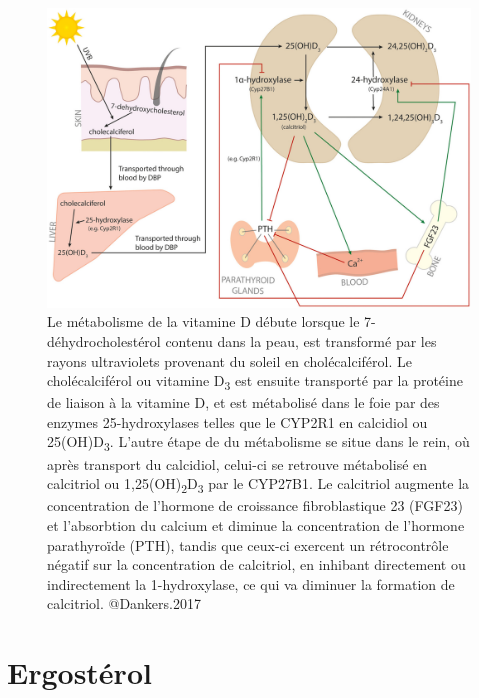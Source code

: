\documentclass[
  a4paper,
  DIV=11,
  numbers=noendperiod,
  listof=totoc]{scrreprt}
\begin{document}
\begin{figure}
\includegraphics{figures/vitamin-d-metabolism-regulation.jpg} 
\caption[\textbf{Métabolisme et régulation de la vitamine D.}]{Le métabolisme de la vitamine D débute lorsque le 7-déhydrocholestérol contenu dans la peau, est transformé par les rayons ultraviolets provenant du soleil en cholécalciférol. Le cholécalciférol ou vitamine D\textsubscript{3} est ensuite transporté par la protéine de liaison à la vitamine D, et est métabolisé dans le foie par des enzymes 25-hydroxylases telles que le CYP2R1 en calcidiol ou 25(OH)D\textsubscript{3}. L'autre étape de du métabolisme se situe dans le rein, où après transport du calcidiol, celui-ci se retrouve métabolisé en calcitriol ou 1,25(OH)\textsubscript{2}D\textsubscript{3} par le CYP27B1. Le calcitriol augmente la concentration de l'hormone de croissance fibroblastique 23 (FGF23) et l'absorbtion du calcium et diminue la concentration de l'hormone parathyroïde (PTH), tandis que ceux-ci exercent un rétrocontrôle négatif sur la concentration de calcitriol, en inhibant directement ou indirectement la 1-hydroxylase, ce qui va diminuer la formation de calcitriol. @Dankers.2017}
\label{fig:reg-vitd}
\end{figure}

\hypertarget{ergostuxe9rol}{%
\section{Ergostérol}\label{ergostuxe9rol}}
\end{document}
